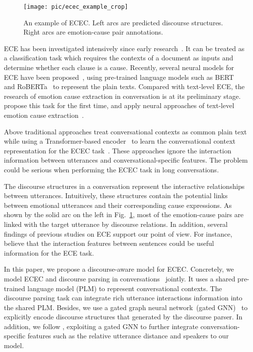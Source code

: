\documentclass[11pt]{article}
\begin{document}
\begin{figure}[t]
\centering
\texttt{[image: pic/ecec\_example\_crop]}
\caption{An example of ECEC. Left arcs are predicted discourse structures. Right arcs are emotion-cause pair annotations.} 
\label{fig1}
\end{figure}

ECE has been investigated intensively since early research~\cite{lee2010text,chen2010emotion}.
It can be treated as a classification task which requires the contexts of a document as inputs and determine whether each clause is a cause.
Recently, several neural models for ECE have been proposed~\cite{dingExperimentalStudyEffects2020,liBoundaryDetectionBERT2021a,huBidirectionalHierarchicalAttention2021}, using pre-trained language models such as BERT~\cite{devlinBertPretrainingDeep2018} and RoBERTa~\cite{liu2019roberta} to represent the plain texts.
Compared with text-level ECE, the research of emotion cause extraction in conversation is at its preliminary stage.
\citet{poria2021recognizing} propose this task for the first time, and apply neural approaches of text-level emotion cause extraction~\cite{wei2020effective,ding2020ecpe,ding2020end}.

Above traditional approaches treat conversational contexts as common plain text while using a Transformer-based encoder~\cite{liu2019roberta} to learn the conversational context representation for the ECEC task~\cite{poria2021recognizing}.
These approaches ignore the interaction information between utterances and conversational-specific features.
The problem could be serious when performing the ECEC task in long conversations.

The discourse structures in a conversation represent the interactive relationships between utterances.
Intuitively, these structures contain the potential links between emotional utterances and their corresponding cause expressions.
As shown by the solid arc on the left in Fig.~\ref{fig1}, most of the emotion-cause pairs are linked with the target utterance by discourse relations.
In addition, several findings of previous studies on ECE support our point of view.
For instance, \citet{huFSSGCNGraphConvolutional2021, dingIndependentPredictionReordered2019} believe that the interaction features between sentences could be useful information for the ECE task.




In this paper, we propose a discourse-aware model for ECEC.
Concretely, we model ECEC and discourse parsing in conversations~\cite{afantenosDiscourseParsingMultiparty2015} jointly.
It uses a shared pre-trained language model (PLM) to represent conversational contexts.
The discourse parsing task can integrate rich utterance interactions information into the shared PLM.
Besides, we use a gated graph neural network~(gated GNN)~\cite{gatedgnn2016} to explicitly encode discourse structures that generated by the discourse parser.
In addition, we follow \citet{wang2021structure}, exploiting a gated GNN to further integrate conversation-specific features such as the relative utterance distance and speakers to our model.
\end{document}
